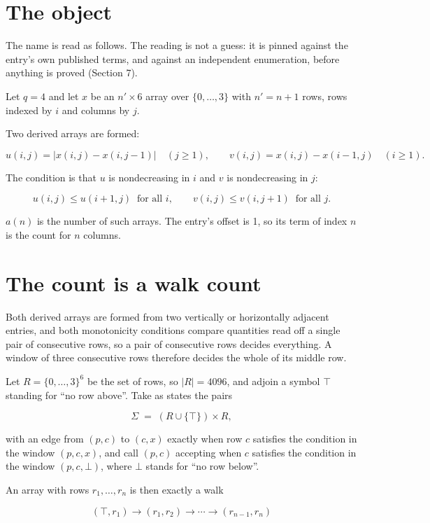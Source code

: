 \documentclass[11pt]{article}
\theoremstyle{definition}
\begin{document}
\section{The object}

The name is read as follows. The reading is not a guess: it is pinned against the entry's own published terms, and against an independent enumeration, before anything is proved (Section 7).

Let $q = 4$ and let $x$ be an $n' \times 6$ array over $\{0,\dots,3\}$ with $n' = n + 1$ rows, rows indexed by $i$ and columns by $j$.

Two derived arrays are formed:

\[u(i,j) = \lvert x(i,j) - x(i,j{-}1)\rvert\quad (j \ge 1), \qquad v(i,j) = x(i,j) - x(i{-}1,j)\quad (i \ge 1).\]

The condition is that $u$ is nondecreasing in $i$ and $v$ is nondecreasing in $j$:

\[u(i,j) \le u(i{+}1,j) \ \text{ for all } i, \qquad v(i,j) \le v(i,j{+}1) \ \text{ for all } j.\]

$a(n)$ is the number of such arrays. The entry's offset is 1, so its term of index $n$ is the count for $n$ columns.

\section{The count is a walk count}

Both derived arrays are formed from two vertically or horizontally adjacent entries, and both monotonicity conditions compare quantities read off a single pair of consecutive rows, so a pair of consecutive rows decides everything. A window of three consecutive rows therefore decides the whole of its middle row.

Let $R = \{0,\dots,3\}^{6}$ be the set of rows, so $|R| = 4096$, and adjoin a symbol $\top$ standing for ``no row above''. Take as states the pairs

\[\Sigma \;=\; (R \cup \{\top\}) \times R,\]

with an edge from $(p,c)$ to $(c,x)$ exactly when row $c$ satisfies the condition in the window $(p,c,x)$, and call $(p,c)$ accepting when $c$ satisfies the condition in the window $(p,c,\bot)$, where $\bot$ stands for ``no row below''.

An array with rows $r_1,\dots,r_n$ is then exactly a walk

\[(\top,r_1) \to (r_1,r_2) \to \cdots \to (r_{n-1},r_n)\]
\end{document}
